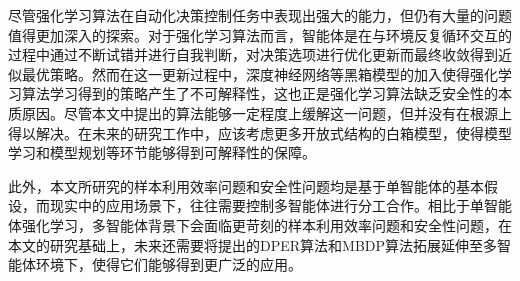 尽管强化学习算法在自动化决策控制任务中表现出强大的能力，但仍有大量的问题值得更加深入的探索。对于强化学习算法而言，智能体是在与环境反复循环交互的过程中通过不断试错并进行自我判断，对决策选项进行优化更新而最终收敛得到近似最优策略。然而在这一更新过程中，深度神经网络等黑箱模型的加入使得强化学习算法学习得到的策略产生了不可解释性，这也正是强化学习算法缺乏安全性的本质原因。尽管本文中提出的算法能够一定程度上缓解这一问题，但并没有在根源上得以解决。在未来的研究工作中，应该考虑更多开放式结构的白箱模型，使得模型学习和模型规划等环节能够得到可解释性的保障。

此外，本文所研究的样本利用效率问题和安全性问题均是基于单智能体的基本假设，而现实中的应用场景下，往往需要控制多智能体进行分工合作。相比于单智能体强化学习，多智能体背景下会面临更苛刻的样本利用效率问题和安全性问题，在本文的研究基础上，未来还需要将提出的DPER算法和MBDP算法拓展延伸至多智能体环境下，使得它们能够得到更广泛的应用。